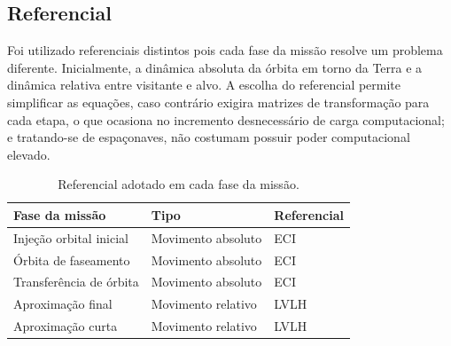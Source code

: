 \subsection{Referencial}

Foi utilizado referenciais distintos pois cada fase da missão resolve um problema diferente.
Inicialmente, a dinâmica absoluta da órbita em torno da Terra e a dinâmica relativa entre visitante e alvo.
A escolha do referencial permite simplificar as equações, caso contrário exigira matrizes de transformação para cada etapa, o que ocasiona no incremento desnecessário de carga computacional; e tratando-se de espaçonaves, não costumam possuir poder computacional elevado.

\begin{table}[ht]
\centering
\caption{Referencial adotado em cada fase da missão.}
\label{tab:fases_tipo_ref}
\begin{tabular}{p{5cm} p{5cm} p{4cm}}
\toprule
\textbf{Fase da missão}& \textbf{Tipo} & \textbf{Referencial} \\
\midrule
Injeção orbital inicial& Movimento absoluto& ECI \\
Órbita de faseamento& Movimento absoluto& ECI \\
Transferência de órbita& Movimento absoluto& ECI \\
Aproximação final& Movimento relativo& LVLH \\
Aproximação curta& Movimento relativo& LVLH \\
\bottomrule
\end{tabular}
\end{table}
